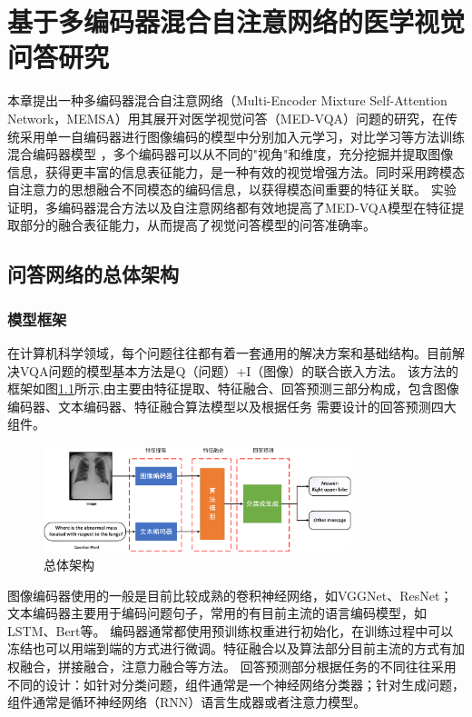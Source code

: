 
\chapter{基于多编码器混合自注意网络的医学视觉问答研究}
本章提出一种多编码器混合自注意网络（Multi-Encoder Mixture Self-Attention Network，MEMSA）用其展开对医学视觉问答（MED-VQA）问题的研究，在传统采用单一自编码器进行图像编码的模型中分别加入元学习，对比学习等方法训练混合编码器模型
，多个编码器可以从不同的"视角"和维度，充分挖掘并提取图像信息，获得更丰富的信息表征能力，是一种有效的视觉增强方法\cite{nguyen2019overcoming}。同时采用跨模态自注意力的思想融合不同模态的编码信息，以获得模态间重要的特征关联。
实验证明，多编码器混合方法以及自注意网络都有效地提高了MED-VQA模型在特征提取部分的融合表征能力，从而提高了视觉问答模型的问答准确率。

\section{问答网络的总体架构}
\subsection{模型框架}
在计算机科学领域，每个问题往往都有着一套通用的解决方案和基础结构。目前解决VQA问题的模型基本方法是Q（问题）+I（图像）的联合嵌入方法\cite{malinowski2015ask}。
该方法的框架如图\ref{Framwork}所示,由主要由特征提取、特征融合、回答预测三部分构成，包含图像编码器、文本编码器、特征融合算法模型以及根据任务
需要设计的回答预测四大组件。

\begin{figure}[htbp]
	\centering	
	\includegraphics[width=0.8\textwidth]{Fig/myfig/chapter3/popline2.png}  %
	\caption{\label{Framwork}总体架构} 
\end{figure}

图像编码器使用的一般是目前比较成熟的卷积神经网络，如VGGNet、ResNet；文本编码器主要用于编码问题句子，常用的有目前主流的语言编码模型，如LSTM、Bert等。
编码器通常都使用预训练权重进行初始化，在训练过程中可以冻结也可以用端到端的方式进行微调。特征融合以及算法部分目前主流的方式有加权融合，拼接融合，注意力融合等方法。
回答预测部分根据任务的不同往往采用不同的设计：如针对分类问题，组件通常是一个神经网络分类器；针对生成问题，组件通常是循环神经网络（RNN）语言生成器或者注意力模型。

